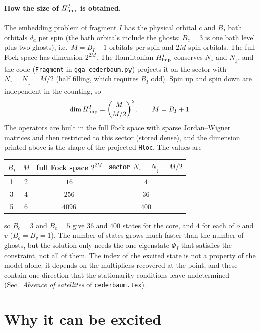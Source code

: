 \documentclass[11pt]{article}
\begin{document}
\paragraph{How the size of $H^I_{\rm imp}$ is obtained.} The embedding problem of fragment $I$ has the physical orbital $c$ and $B_I$ bath orbitals $d_a$ per spin
(the bath orbitals include the ghosts: $B_c=3$ is one bath level plus two ghosts), i.e.\ $M=B_I+1$ orbitals per spin and $2M$ spin orbitals. The full Fock space has dimension $2^{2M}$.
The Hamiltonian $H^I_{\rm imp}$ conserves $N_\uparrow$ and $N_\downarrow$, and the code (\texttt{Fragment} in \texttt{gga\_cederbaum.py}) projects it on the sector with
$N_\uparrow=N_\downarrow=M/2$ (half filling, which requires $B_I$ odd). Spin up and spin down are independent in the counting, so
\begin{equation}
\dim H^I_{\rm imp}=\binom{M}{M/2}^2,\qquad M=B_I+1 .
\end{equation}
The operators are built in the full Fock space with sparse Jordan--Wigner matrices and then restricted to this sector (stored dense), and the dimension printed above is the shape of the projected
\texttt{Hloc}. The values are
\begin{center}\small
\begin{tabular}{c c c c}
\toprule
$B_I$ & $M$ & full Fock space $2^{2M}$ & sector $N_\uparrow=N_\downarrow=M/2$\\
\midrule
1 & 2 & $16$ & $4$\\
3 & 4 & $256$ & $36$\\
5 & 6 & $4096$ & $400$\\
\bottomrule
\end{tabular}
\end{center}
so $B_c=3$ and $B_c=5$ give $36$ and $400$ states for the core, and $4$ for each of $o$ and $v$ ($B_o=B_v=1$). The number of states grows much faster than the number of ghosts, but
the solution only needs the one eigenstate $\Phi_I$ that satisfies the constraint, not all of them. The index of the excited state is not a property of the model alone: it
depends on the multipliers recovered at the point, and these contain one direction that the stationarity conditions leave undetermined (Sec.~\emph{Absence of satellites} of \texttt{cederbaum.tex}).

\section{Why it can be excited}
\end{document}

